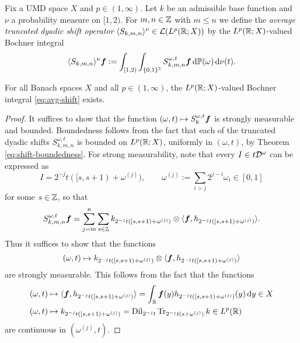  \begin{defn}
   Fix a UMD space $X$ and $p \in (1,\infty)$.
   Let $k$ be an admissible base function and $\nu$ a probability measure on $[1,2)$.
   For $m,n \in \mathbb{Z}$ with $m \leq n$ we define the \emph{average truncated dyadic shift operator} $\langle S_{k,m,n} \rangle^{\nu} \in \mathcal{L}(L^p(\mathbb{R};X))$ by the $L^p(\mathbb{R};X)$-valued Bochner integral
   \begin{equation}\label{eq:avg-shift}
     \langle S_{k,m,n} \rangle^{\nu}\bm{f} := \int_{[1,2)} \int_{\{0,1\}^{\mathbb{Z}}} S_{k,m,n}^{\omega, t}\bm{f} \, \mathrm{d} \mathbb{P}(\omega) \, \mathrm{d} \nu(t).
   \end{equation}
 \end{defn}
 
\begin{lem}
  For all Banach spaces $X$ and all $p \in (1,\infty)$, the $L^p(\mathbb{R};X)$-valued Bochner integral \eqref{eq:avg-shift} exists.
\end{lem}

\begin{proof}
It suffices to show that the function $(\omega,t) \mapsto S_{k}^{\omega, t}\bm{f}$ is strongly measurable and bounded.
Boundedness follows from the fact that each of the truncated dyadic shifts $S_{k,m,n}^{\omega,t}$ is bounded on $L^p(\mathbb{R};X)$, uniformly in $(\omega,t)$, by Theorem \ref{eq:shift-boundedness}.
For strong measurability, note that every $I \in t\mathcal{D}^{\omega}$ can be expressed as
\begin{equation}\label{eq:interval-parametrisation}
  I = 2^{-j}t([s,s+1) + \omega^{(j)}), \qquad \omega^{(j)} := \sum_{i > j} 2^{j-i} \omega_{i} \in [0,1]
\end{equation}
for some $s \in \mathbb{Z}$, so that
\begin{equation*}
  S_{k,m,n}^{\omega, t}\bm{f} = \sum_{j = m}^{n} \sum_{s \in \mathbb{Z}} k_{2^{-j}t([s,s+1) + \omega^{(j)})} \otimes \langle \bm{f}, h_{2^{-j}t([s,s+1) + \omega^{(j)})} \rangle.
\end{equation*}
Thus it suffices to show that the functions
\begin{equation*}
  (\omega,t) \mapsto k_{2^{-j}t([s,s+1) + \omega^{(j)})} \otimes \langle \bm{f}, h_{2^{-j}t([s,s+1) + \omega^{(j)})} \rangle
\end{equation*}
are strongly measurable.
This follows from the fact that the functions
\begin{equation*}
  \begin{aligned}
    (\omega,t) &\mapsto \langle \bm{f}, h_{2^{-j}t([s,s+1) + \omega^{(j)})} \rangle = \int_{\mathbb{R}} \bm{f}(y) h_{2^{-j}t([s,s+1) + \omega^{(j)})}(y) \, \mathrm{d} y \in X\\
    (\omega,t) &\mapsto k_{2^{-j}t([s,s+1) + \omega^{(j)})} = \operatorname{Dil}_{2^{-j}t} \operatorname{Tr}_{2^{-j}t(s + \omega^{(j)})} k \in L^p(\mathbb{R})
\end{aligned}
\end{equation*}
are continuous in $(\omega^{(j)},t)$.
\end{proof}

